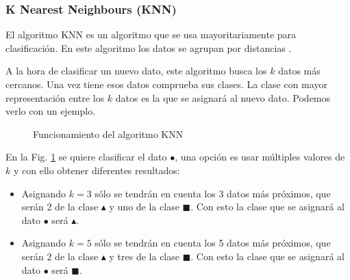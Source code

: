\subsubsection{K Nearest Neighbours (KNN)}

El algoritmo KNN es un algoritmo que se usa mayoritariamente para clasificación. En este algoritmo los datos se agrupan por distancias \cite{taunk2019brief}. 

A la hora de clasificar un nuevo dato, este algoritmo busca los $k$ datos más cercanos. Una vez tiene esos datos comprueba sus clases. La clase con mayor representación entre los $k$ datos es la que se asignará al nuevo dato. Podemos verlo con un ejemplo.

\begin{figure}[htpb!]
    \centering
    \caption{Funcionamiento del algoritmo KNN \cite{knnalgorithm2010}}
    \label{fig:knn_clasification}
\end{figure}

En la Fig. \ref{fig:knn_clasification} se quiere clasificar el dato \textcolor{verdedato}{\Large$\bullet$}, una opción es usar múltiples valores de $k$ y con ello obtener diferentes resultados:
\begin{itemize}
    \item Asignando $k = 3$ sólo se tendrán en cuenta los 3 datos más próximos, que serán 2 de la clase \textcolor{rojodato}{\large$\blacktriangle$} y uno de la clase \textcolor{azuldato}{$\blacksquare$}. Con esto la clase que se asignará al dato \textcolor{verdedato}{\Large$\bullet$} será \textcolor{rojodato}{\large$\blacktriangle$}.
    \item Asignando $k = 5$ sólo se tendrán en cuenta los 5 datos más próximos, que serán 2 de la clase \textcolor{rojodato}{\large$\blacktriangle$} y tres de la clase \textcolor{azuldato}{$\blacksquare$}. Con esto la clase que se asignará al dato \textcolor{verdedato}{\Large$\bullet$} será \textcolor{azuldato}{$\blacksquare$}.
\end{itemize}

